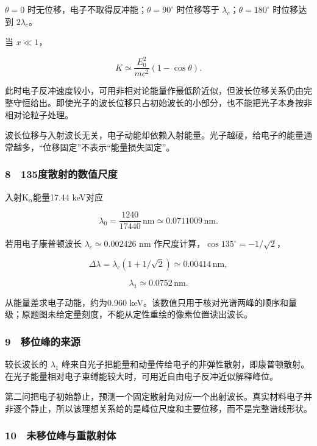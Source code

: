 \documentclass[12pt,a4paper,fontset=fandol]{ctexart}
\begin{document}
\(\theta=0\) 时无位移，电子不取得反冲能；\(\theta=90^\circ\) 时位移等于
\(\lambda_c\)；\(\theta=180^\circ\) 时位移达到 \(2\lambda_c\)。

当 \(x\ll1\)，

\[K\simeq\frac{E_0^2}{mc^2}(1-\cos\theta).\]

此时电子反冲速度较小，可用非相对论能量作最低阶近似，但波长位移关系仍由完整守恒给出。即使光子的波长位移只占初始波长的小部分，也不能把光子本身按非相对论粒子处理。

波长位移与入射波长无关，电子动能却依赖入射能量。光子越硬，给电子的能量通常越多，``位移固定''不表示``能量损失固定''。

\subsubsection{8　135度散射的数值尺度}\label{ux5ea6ux6563ux5c04ux7684ux6570ux503cux5c3aux5ea6}

入射K\(_\alpha\)能量17.44 keV对应

\[\lambda_0=\frac{1240}{17440}\,\mathrm{nm}
\simeq0.0711009\,\mathrm{nm}.\]

若用电子康普顿波长 \(\lambda_c\simeq0.002426\) nm
作尺度计算，\(\cos135^\circ=-1/\sqrt2\)，

\[\Delta\lambda=\lambda_c(1+1/\sqrt2)
\simeq0.00414\,\mathrm{nm},\]

\[\lambda_1\simeq0.0752\,\mathrm{nm}.\]

从能量差求电子动能，约为0.960
keV。该数值只用于核对光谱两峰的顺序和量级；原题图未给定量刻度，不能从定性重绘的像素位置读出波长。

\subsubsection{9　移位峰的来源}\label{ux79fbux4f4dux5cf0ux7684ux6765ux6e90}

较长波长的 \(\lambda_1\)
峰来自光子把能量和动量传给电子的非弹性散射，即康普顿散射。在光子能量相对电子束缚能较大时，可用近自由电子反冲近似解释峰位。

第二问把电子初始静止，预测一个固定散射角对应一个出射波长。真实材料电子并非逐个静止，所以该理想关系给的是峰位尺度和主要位移，而不是完整谱线形状。

\subsubsection{10　未移位峰与重散射体}\label{ux672aux79fbux4f4dux5cf0ux4e0eux91cdux6563ux5c04ux4f53}
\end{document}
